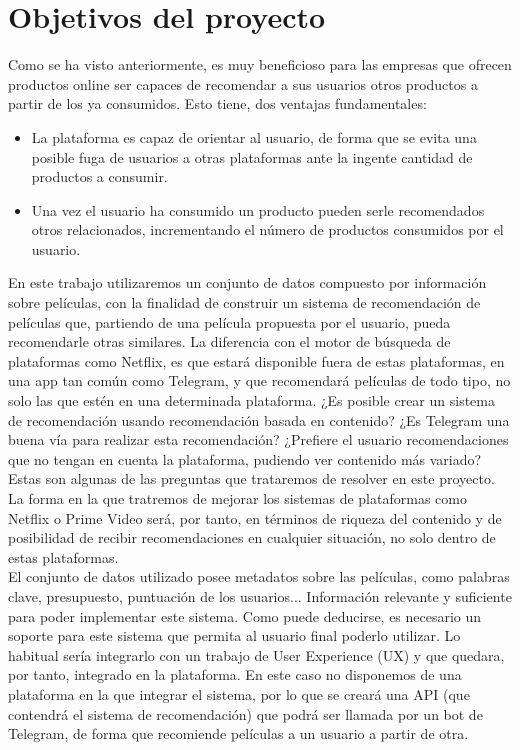 \section{Objetivos del proyecto}\label{sec:objetivos}

Como se ha visto anteriormente, es muy beneficioso para las empresas que ofrecen productos online ser capaces de recomendar a sus usuarios otros productos a partir de los ya consumidos. Esto tiene, dos ventajas fundamentales:

\begin{itemize}
    \item La plataforma es capaz de orientar al usuario, de forma que se evita una posible fuga de usuarios a otras plataformas ante la ingente cantidad de productos a consumir.
    \item Una vez el usuario ha consumido un producto pueden serle recomendados otros relacionados, incrementando el número de productos consumidos por el usuario.
\end{itemize}

En este trabajo utilizaremos un conjunto de datos compuesto por información sobre películas, con la finalidad de construir un sistema de recomendación de películas que, partiendo de una película propuesta por el usuario, pueda recomendarle otras similares. La diferencia con el motor de búsqueda de plataformas como Netflix, es que estará disponible fuera de estas plataformas, en una app tan común como Telegram, y que recomendará películas de todo tipo, no solo las que estén en una determinada plataforma. ¿Es posible crear un sistema de recomendación usando recomendación basada en contenido? ¿Es Telegram una buena vía para realizar esta recomendación? ¿Prefiere el usuario recomendaciones que no tengan en cuenta la plataforma, pudiendo ver contenido más variado? Estas son algunas de las preguntas que trataremos de resolver en este proyecto. La forma en la que tratremos de mejorar los sistemas de plataformas como Netflix o Prime Video será, por tanto, en términos de riqueza del contenido y de posibilidad de recibir recomendaciones en cualquier situación, no solo dentro de estas plataformas.\\

El conjunto de datos utilizado posee metadatos sobre las películas, como palabras clave, presupuesto, puntuación de los usuarios... Información relevante y suficiente para poder implementar este sistema. Como puede deducirse, es necesario un soporte para este sistema que permita al usuario final poderlo utilizar. Lo habitual sería integrarlo con un trabajo de User Experience (UX) y que quedara, por tanto, integrado en la plataforma. En este caso no disponemos de una plataforma en la que integrar el sistema, por lo que se creará una API (que contendrá el sistema de recomendación) que podrá ser llamada por un bot de Telegram, de forma que recomiende películas a un usuario a partir de otra.\\

